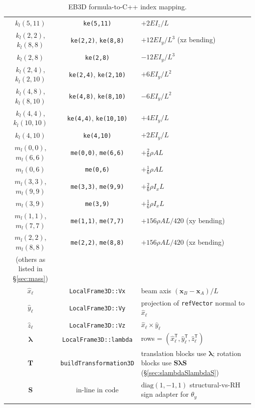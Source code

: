 \documentclass[11pt,a4paper]{article}
\newcommand{\bmath}[1]{\boldsymbol{#1}}
\begin{document}
\begin{longtable}{c c l}
$k_l(5,11)$               & \texttt{ke(5,11)}                    & $+2 E I_z/L$ \\
$k_l(2,2)$, $k_l(8,8)$    & \texttt{ke(2,2)}, \texttt{ke(8,8)}   & $+12 E I_y/L^3$ (xz bending) \\
$k_l(2,8)$                & \texttt{ke(2,8)}                     & $-12 E I_y/L^3$ \\
$k_l(2,4)$, $k_l(2,10)$   & \texttt{ke(2,4)}, \texttt{ke(2,10)}  & $+6 E I_y/L^2$ \\
$k_l(4,8)$, $k_l(8,10)$   & \texttt{ke(4,8)}, \texttt{ke(8,10)}  & $-6 E I_y/L^2$ \\
$k_l(4,4)$, $k_l(10,10)$  & \texttt{ke(4,4)}, \texttt{ke(10,10)} & $+4 E I_y/L$ \\
$k_l(4,10)$               & \texttt{ke(4,10)}                    & $+2 E I_y/L$ \\
\midrule
$m_l(0,0)$, $m_l(6,6)$    & \texttt{me(0,0)}, \texttt{me(6,6)}   & $+\tfrac{2}{6}\rho A L$ \\
$m_l(0,6)$                & \texttt{me(0,6)}                     & $+\tfrac{1}{6}\rho A L$ \\
$m_l(3,3)$, $m_l(9,9)$    & \texttt{me(3,3)}, \texttt{me(9,9)}   & $+\tfrac{2}{6}\rho I_x L$ \\
$m_l(3,9)$                & \texttt{me(3,9)}                     & $+\tfrac{1}{6}\rho I_x L$ \\
$m_l(1,1)$, $m_l(7,7)$    & \texttt{me(1,1)}, \texttt{me(7,7)}   & $+156 \rho A L/420$ (xy bending) \\
$m_l(2,2)$, $m_l(8,8)$    & \texttt{me(2,2)}, \texttt{me(8,8)}   & $+156 \rho A L/420$ (xz bending) \\
(others as listed in \S\ref{sec:mass}) & & \\
\midrule
$\hat{x}_\ell$            & \texttt{LocalFrame3D::Vx}            & beam axis $(\bmath{x}_B - \bmath{x}_A)/L$ \\
$\hat{y}_\ell$            & \texttt{LocalFrame3D::Vy}            & projection of \texttt{refVector} normal to $\hat{x}_\ell$ \\
$\hat{z}_\ell$            & \texttt{LocalFrame3D::Vz}            & $\hat{x}_\ell \times \hat{y}_\ell$ \\
$\bmath{\lambda}$         & \texttt{LocalFrame3D::lambda}        & rows = $(\hat{x}_\ell^\mathsf{T}, \hat{y}_\ell^\mathsf{T}, \hat{z}_\ell^\mathsf{T})$ \\
$\bmath{T}$               & \texttt{buildTransformation3D}        & translation blocks use $\bmath{\lambda}$; rotation blocks use $\bmath{S}\bmath{\lambda}\bmath{S}$ (\S\ref{sec:slambdaSlambdaS}) \\
$\bmath{S}$               & in-line in code                       & $\mathrm{diag}(1,-1,1)$ structural-vs-RH sign adapter for $\theta_y$ \\
\bottomrule
\caption{EB3D formula-to-C++ index mapping.}
\end{longtable}
\end{document}
